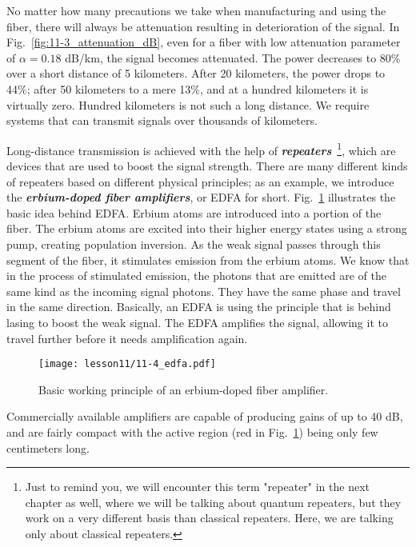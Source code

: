 No matter how many precautions we take when manufacturing and using the fiber, there will always be attenuation resulting in deterioration of the signal.
In Fig.~\ref{fig:11-3_attenuation_dB}, even for a fiber with low attenuation parameter of $\alpha=0.18$ dB/km, the signal becomes attenuated.
The power decreases to 80\% over a short distance of 5 kilometers.
After 20 kilometers, the power drops to 44\%; after 50 kilometers to a mere 13\%, and at a hundred kilometers it is virtually zero.
Hundred kilometers is not such a long distance.
We require systems that can transmit signals over thousands of kilometers.

Long-distance transmission is achieved with the help of \textbf{\emph{repeaters}}~\footnote{Just to remind you, we will encounter this term "repeater" in the next chapter as well, where we will be talking about quantum repeaters, but they work on a very different basis than classical repeaters. Here, we are talking only about classical repeaters.}, which are devices that are used to boost the signal strength.
There are many different kinds of repeaters based on different physical principles; as an example, we introduce the \textbf{\emph{erbium-doped fiber amplifiers}}, or EDFA for short.
Fig.~\ref{fig:11-4_edfa} illustrates the basic idea behind EDFA.
Erbium atoms are introduced into a portion of the fiber.
The erbium atoms are excited into their higher energy states using a strong pump, creating population inversion.
As the weak signal passes through this segment of the fiber, it stimulates emission from the erbium atoms.
We know that in the process of stimulated emission, the photons that are emitted are of the same kind as the incoming signal photons.
They have the same phase and travel in the same direction.
Basically, an EDFA is using the principle that is behind lasing to boost the weak signal.
The EDFA amplifies the signal, allowing it to travel further before it needs amplification again.
\begin{figure}[t]
    \centering
    \texttt{[image: lesson11/11-4\_edfa.pdf]}
    \caption[Erbium-doped fiber amplifier (EDFA).]{Basic working principle of an erbium-doped fiber amplifier.}
    \label{fig:11-4_edfa}
\end{figure}
Commercially available amplifiers are capable of producing gains of up to 40 dB, and are fairly compact with the active region (red in Fig.~\ref{fig:11-4_edfa}) being only few centimeters long.

